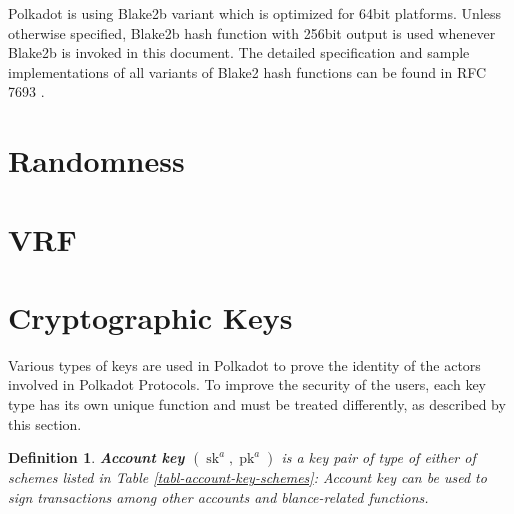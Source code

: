 \documentclass{book}
\newcommand{\tmop}[1]{\ensuremath{\operatorname{#1}}}
\newcommand{\tmstrong}[1]{\textbf{#1}}
\newcommand{\tmtextbf}[1]{{\bfseries{#1}}}
\newtheorem{definition}{Definition}
\providecommand{\tmop}[1]{\ensuremath{\mathrm{#1}}}
\providecommand{\tmstrong}[1]{\tmtextbf{#1}}
\providecommand{\tmtextbf}[1]{\tmtextbf{#1}}
\newtheorem{definition}{Definition}
\begin{document}
Polkadot is using Blake2b variant which is optimized for 64bit platforms.
Unless otherwise specified, Blake2b hash function with 256bit output is used
whenever Blake2b is invoked in this document. The detailed specification and
sample implementations of all variants of Blake2 hash functions can be found
in RFC 7693 {\cite{saarinen_blake2_2015}}.

\section{Randomness}\label{sect-randomness}

\section{VRF}\label{sect-vrf}

\section{Cryptographic Keys}\label{sect-cryptographic-keys}

Various types of keys are used in Polkadot to prove the identity of the actors
involved in Polkadot Protocols. To improve the security of the users, each key
type has its own unique function and must be treated differently, as described
by this section.

\begin{definition}
  \label{defn-account-key}{\tmstrong{Account key $(\tmop{sk}^a,
  \tmop{pk}^a)$}} is a key pair of type of either of schemes listed in Table
  \ref{tabl-account-key-schemes}:
  {}
  Account key can be used to sign transactions among other accounts and
  blance-related functions.
\end{definition}
\end{document}
